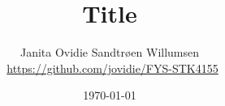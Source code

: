\documentclass[reprint,english,notitlepage]{revtex4-1}  %
\begin{document}

% 


% 
\title{Title}
\author{Janita Ovidie Sandtrøen Willumsen \\ \faGithub \, \url{https://github.com/jovidie/FYS-STK4155}}        
\date{\today}
\noaffiliation

% 
\maketitle

% 
% 
% 

% 
% 
% 
 
% 

% 


\end{document}
